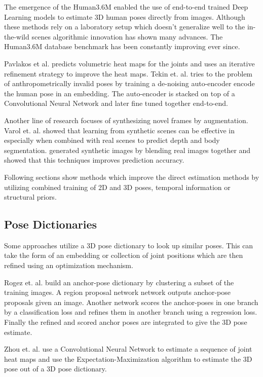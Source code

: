 The emergence of the Human3.6M \parencite{ionescu2014human3} enabled the use of end-to-end trained Deep Learning models to estimate 3D human poses directly from images. Although these methods rely on a laboratory setup which doesn't generalize well to the in-the-wild scenes algorithmic innovation has shown many advances. The Human3.6M database benchmark has been constantly improving ever since.

Pavlakos et al. \parencite{pavlakos2017coarse} predicts volumetric heat maps for the joints and uses an iterative refinement strategy to improve the heat maps. Tekin et. al. \parencite{tekin2016structured} tries to the problem of anthropometrically invalid poses by training a de-noising auto-encoder encode the human pose in an embedding. The auto-encoder is stacked on top of a Convolutional Neural Network and later fine tuned together end-to-end.

Another line of research focuses of synthesizing novel frames by augmentation. Varol et. al. \parencite{varol2017learning} showed that learning from synthetic scenes can be effective in especially when combined with real scenes to predict depth and body segmentation. \parencite{rogez2016mocap} generated synthetic images by blending real images  together and showed that this techniques improves prediction accuracy.

Following sections show methods which improve the direct estimation methods by utilizing combined training of 2D and 3D poses, temporal information or structural priors.

\subsection{Pose Dictionaries}

Some approaches utilize a 3D pose dictionary to look up similar poses. This can take the form of an embedding or collection of joint positions which are then refined using an optimization mechanism.

Rogez et. al. \parencite{rogez2017lcr} build an anchor-pose dictionary by clustering a subset of the training images. A region proposal network \parencite{ren2015faster} network outputs anchor-pose proposals given an image. Another network scores the anchor-poses in one branch by a classification loss and refines them in another branch using a regression loss. Finally the refined and scored anchor poses are integrated to give the 3D pose estimate.

Zhou et. al. \parencite{zhou2016sparseness} use a Convolutional Neural Network to estimate a sequence of joint heat maps and use the Expectation-Maximization algorithm to estimate the 3D pose out of a 3D pose dictionary. 

